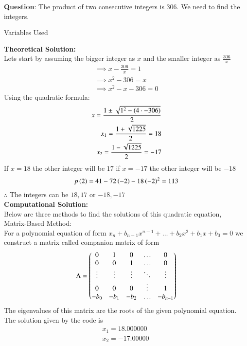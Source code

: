 \documentclass[journal]{IEEEtran}
\begin{document}
\textbf{Question}:\newline
The product of two consecutive integers is $306$. We need to find the integers.
\newline
\begin{table}[h!]    
  \centering
  
  \caption{Variables Used}
  \label{tab1.1.2.2}
\end{table}
\newline
\textbf{Theoretical Solution:}\\
Lets start by assuming the bigger integer as $x$ and the smaller integer as $\frac{306}{x}$
\begin{align}
    \implies x-\frac{306}{x}=1\\
    \implies x^2-306=x\\
    \implies x^2-x-306=0
\end{align}
Using the quadratic formula:
\begin{align}
    x=\frac{1\pm\sqrt{1^2-\left(4\cdot -306\right)}}{2}\\
    x_1=\frac{1+\sqrt{1225}}{2}=18\\
    x_2=\frac{1-\sqrt{1225}}{2}=-17
\end{align}
If $x=18$ the other integer will be $17$ if $x=-17$ the other integer will be $-18$
\begin{align}
    p\left(2\right)=41-72\left(-2\right)-18\left(-2\right)^2=113
\end{align}
$\therefore$ The integers can be $18,17$ or $-18,-17$\\
\textbf{Computational Solution:}\\
Below are three methods to find the solutions of this quadratic equation,\\
Matrix-Based Method:\\
For a polynomial equation of form $x_n+b_{n-1}x^{n-1}+\dots+b_2x^2+b_1x+b_0 = 0$ we construct a matrix called companion matrix of form
\begin{align}
	\Lambda = \begin{pmatrix}0&1&0&\dots&0\\ 0&0&1&\dots&0\\ \vdots &\vdots &\vdots &\ddots&\vdots\\0&0&0&\vdots&1\\-b_0&-b_1&-b_2&\dots&-b_{n-1}\end{pmatrix}
\end{align}
The eigenvalues of this matrix are the roots of the given polynomial equation.\\
The solution given by the code is
\begin{align}
	x_1 = 18.000000\\
	x_2 = -17.00000\
\end{align}
\end{document}
